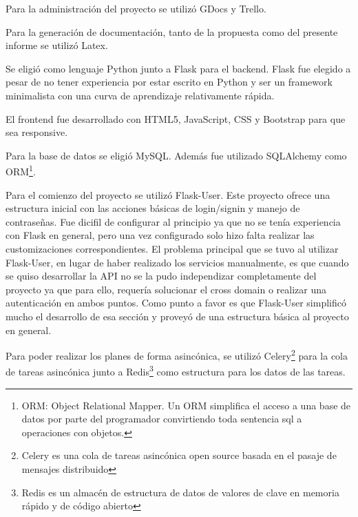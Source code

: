 \documentclass[a4paper]{article}
\begin{document}
Para la administración del proyecto se utilizó GDocs y Trello.\newline

Para la generación de documentación, tanto de la propuesta como del presente informe se utilizó Latex.\newline

Se eligió como lenguaje Python junto a Flask\cite{FLASK_OFICIAL} para el backend. Flask fue elegido a pesar de no tener experiencia por estar escrito en Python y ser un framework minimalista con una curva de aprendizaje relativamente rápida.\newline

El frontend fue desarrollado con HTML5, JavaScript, CSS y Bootstrap\cite{BOOTSTRAP} para que sea responsive.\newline

Para la base de datos se eligió MySQL\cite{MYSQL}. Además fue utilizado SQLAlchemy \cite{SQLALCHEMY_OFICIAL} como ORM\footnote{ORM: Object Relational Mapper. Un ORM simplifica el acceso a una base de datos por parte del programador convirtiendo toda sentencia sql a operaciones con objetos.}.\newline

Para el comienzo del proyecto se utilizó Flask-User\cite{FLASK_USER}. Este proyecto ofrece una estructura inicial con las acciones básicas de login/signin y manejo de contraseñas. Fue dicifil de configurar al principio ya que no se tenía experiencia con Flask en general, pero una vez configurado solo hizo falta realizar las customizaciones correspondientes. El problema principal que se tuvo al utilizar Flask-User, en lugar de haber realizado los servicios manualmente, es que cuando se quiso desarrollar la API no se la pudo independizar completamente del proyecto ya que para ello, requería solucionar el cross domain o realizar una autenticación en ambos puntos. Como punto a favor es que Flask-User simplificó mucho el desarrollo de esa sección y proveyó de una estructura básica al proyecto en general.\newline

Para poder realizar los planes de forma asincónica, se utilizó Celery\footnote{Celery es una cola de tareas asincónica open source basada en el pasaje de mensajes distribuido}\cite{CELERY} para la cola de tareas asincónica junto a Redis\footnote{Redis es un almacén de estructura de datos de valores de clave en memoria rápido y de código abierto}\cite{REDIS} como estructura para los datos de las tareas.\newline
\end{document}
